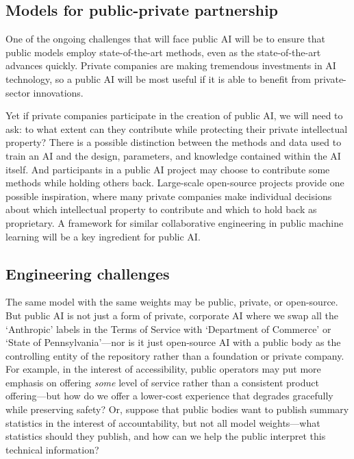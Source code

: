 \documentclass{article}
\begin{document}
\subsection{Models for public-private partnership}

One of the ongoing challenges that will face public AI will be to ensure that public models employ state-of-the-art methods, even as the state-of-the-art advances quickly. Private companies are making tremendous investments in AI technology, so a public AI will be most useful if it is able to benefit from private-sector innovations.

Yet if private companies participate in the creation of public AI, we will need to ask: to what extent can they contribute while protecting their private intellectual property?  There is a possible distinction between the methods and data used to train an AI and the design, parameters, and knowledge contained within the AI itself.  And participants in a public AI project may choose to contribute some methods while holding others back. Large-scale open-source projects provide one possible inspiration, where many private companies make individual decisions about which intellectual property to contribute and which to hold back as proprietary. A framework for similar collaborative engineering in public machine learning will be a key ingredient for public AI.

\subsection{Engineering challenges}

The same model with the same weights may be public, private, or open-source. But public AI is not just a form of private, corporate AI where we swap all the `Anthropic' labels in the Terms of Service with `Department of Commerce' or `State of Pennsylvania'---nor is it just open-source AI with a public body as the controlling entity of the repository rather than a foundation or private company. For example, in the interest of accessibility, public operators may put more emphasis on offering \emph{some} level of service rather than a consistent product offering---but how do we offer a lower-cost experience that degrades gracefully while preserving safety? Or, suppose that public bodies want to publish summary statistics in the interest of accountability, but not all model weights---what statistics should they publish, and how can we help the public interpret this technical information?
\end{document}
